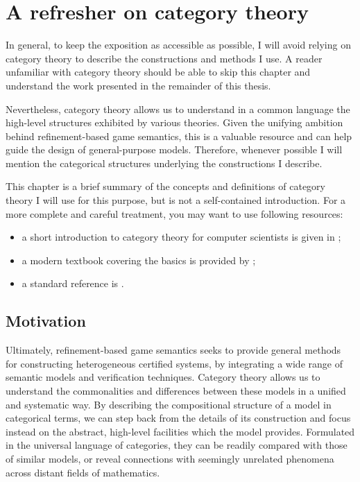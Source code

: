 \documentclass[11pt,oneside]{book}
\theoremstyle{definition}
\begin{document}



\chapter{A refresher on category theory} \label{chap:ct} %


In general,
to keep the exposition
as accessible as possible,
I will avoid relying on category theory
to describe the constructions and methods
I use.
A reader unfamiliar with category theory
should be able to skip this chapter
and understand the work presented
in the remainder of this thesis.

Nevertheless,
category theory
allows us to understand
in a common language
the high-level structures
exhibited by various theories.
Given the unifying ambition behind
refinement-based game semantics,
this is a valuable resource
and can help guide the design of general-purpose models.
Therefore,
whenever possible I will mention the categorical structures
underlying the constructions I describe.

This chapter is a brief summary of the concepts and definitions
of category theory I will use for this purpose,
but is not a self-contained introduction.
For a more complete and careful treatment,
you may want to use following resources:
\begin{itemize}
  \item
    a short introduction to category theory for computer scientists
    is given in \citet{ctcs};
  \item
    a modern textbook covering the basics is provided by \cite{awodeyct};
  \item
    a standard reference is \cite{maclane}.
\end{itemize}


\section{Motivation} %

Ultimately,
refinement-based game semantics seeks
to provide general methods for
constructing heterogeneous certified systems,
by integrating a wide range of
semantic models and verification techniques.
Category theory allows us to
understand the commonalities and differences
between these models
in a unified and systematic way.
By describing the compositional structure of a model
in categorical terms,
we can step back from the details of its construction
and focus instead on
the abstract, high-level facilities which the model provides.
Formulated
in the universal language of categories,
they can be readily compared with those of similar models,
or reveal connections with
seemingly unrelated phenomena across
distant fields of mathematics.
\end{document}
